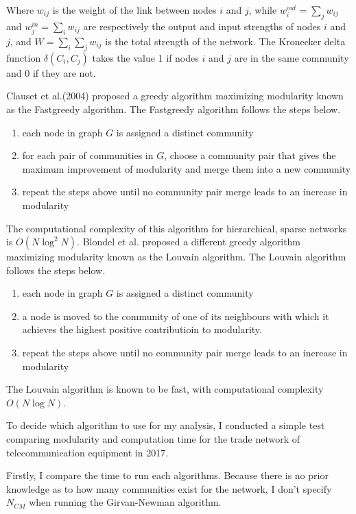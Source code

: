\documentclass[a4paper, 12pt]{article}
\begin{document}
Where $w_{ij}$ is the weight of the link between nodes $i$ and $j$, while $w_i^{out} = \sum_j{w_{ij}}$ and $w_j^{in} = \sum_i{w_{ij}}$ are respectively the output and input strengths of nodes $i$ and $j$, and $W=\sum_i{\sum_j{w_{ij}}}$ is the total strength of the network.
The Kronecker delta function $\delta(C_i, C_j)$ takes the value 1 if nodes $i$ and $j$ are in the same community and 0 if they are not.\par
Clauset et al.(2004)\cite{clauset2004finding} proposed a greedy algorithm maximizing modularity known as the Fastgreedy algorithm.
The Fastgreedy algorithm follows the steps below.
\begin{enumerate}
    \item each node in graph $G$ is assigned a distinct community
    \item for each pair of communities in $G$, choose a community pair that gives the maximum improvement of modularity and merge them into a new community
    \item repeat the steps above until no community pair merge leads to an increase in modularity
\end{enumerate}
The computational complexity of this algorithm for hierarchical, sparse networks is $O(N\log
 ^2N)$\cite{yang2016comparative}.
Blondel et al.\cite{blondel2008} proposed a different greedy algorithm maximizing modularity known as the Louvain algorithm.
The Louvain algorithm follows the steps below.
\begin{enumerate}
    \item each node in graph $G$ is assigned a distinct community
    \item a node is moved to the community of one of its neighbours with which it achieves the highest positive contributioin to modularity.
    \item repeat the steps above until no community pair merge leads to an increase in modularity
\end{enumerate}
The Louvain algorithm is known to be fast, with computational complexity $O(N\log N)$\cite{yang2016comparative}.\par
To decide which algorithm to use for my analysis, I conducted a simple test comparing modularity and computation time for the trade network of telecommunication equipment in 2017.\par
Firstly, I compare the time to run each algorithms.
Because there is no prior knowledge as to how many communities exist for the network, I don't specify $N_{CM}$ when running the Girvan-Newman algorithm.
\end{document}
